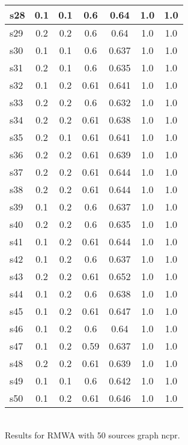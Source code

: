 \documentclass{article}
\begin{document}
\begin{tabular}{|l|c|c|c|c|c|c|}
\hline
s28 &0.1 & 0.1 & 0.6 & 0.64 & 1.0 & 1.0\\
\hline
s29 &0.2 & 0.2 & 0.6 & 0.64 & 1.0 & 1.0\\
\hline
s30 &0.1 & 0.1 & 0.6 & 0.637 & 1.0 & 1.0\\
\hline
s31 &0.2 & 0.1 & 0.6 & 0.635 & 1.0 & 1.0\\
\hline
s32 &0.1 & 0.2 & 0.61 & 0.641 & 1.0 & 1.0\\
\hline
s33 &0.2 & 0.2 & 0.6 & 0.632 & 1.0 & 1.0\\
\hline
s34 &0.2 & 0.2 & 0.61 & 0.638 & 1.0 & 1.0\\
\hline
s35 &0.2 & 0.1 & 0.61 & 0.641 & 1.0 & 1.0\\
\hline
s36 &0.2 & 0.2 & 0.61 & 0.639 & 1.0 & 1.0\\
\hline
s37 &0.2 & 0.2 & 0.61 & 0.644 & 1.0 & 1.0\\
\hline
s38 &0.2 & 0.2 & 0.61 & 0.644 & 1.0 & 1.0\\
\hline
s39 &0.1 & 0.2 & 0.6 & 0.637 & 1.0 & 1.0\\
\hline
s40 &0.2 & 0.2 & 0.6 & 0.635 & 1.0 & 1.0\\
\hline
s41 &0.1 & 0.2 & 0.61 & 0.644 & 1.0 & 1.0\\
\hline
s42 &0.1 & 0.2 & 0.6 & 0.637 & 1.0 & 1.0\\
\hline
s43 &0.2 & 0.2 & 0.61 & 0.652 & 1.0 & 1.0\\
\hline
s44 &0.1 & 0.2 & 0.6 & 0.638 & 1.0 & 1.0\\
\hline
s45 &0.1 & 0.2 & 0.61 & 0.647 & 1.0 & 1.0\\
\hline
s46 &0.1 & 0.2 & 0.6 & 0.64 & 1.0 & 1.0\\
\hline
s47 &0.1 & 0.2 & 0.59 & 0.637 & 1.0 & 1.0\\
\hline
s48 &0.2 & 0.2 & 0.61 & 0.639 & 1.0 & 1.0\\
\hline
s49 &0.1 & 0.1 & 0.6 & 0.642 & 1.0 & 1.0\\
\hline
s50 &0.1 & 0.2 & 0.61 & 0.646 & 1.0 & 1.0\\
\hline
\end{tabular}\\

\noindent Results for RMWA with 50 sources graph ncpr.
\end{document}
